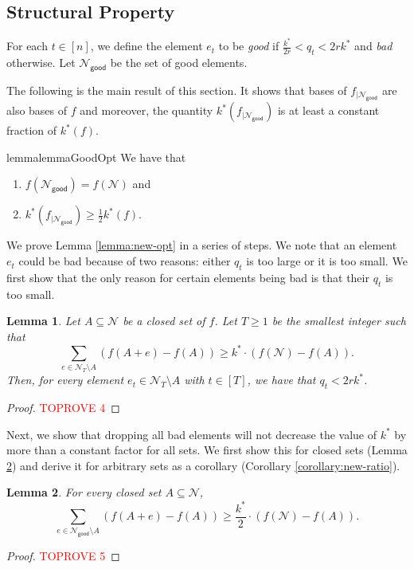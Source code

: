 \documentclass[11pt]{article}
\newtheorem{lemma}{Lemma}
\theoremstyle{definition}
\newcommand{\calN}{{\mathcal{N}}}
\newcommand{\good}{\mathsf{good}}
\begin{document}
\subsection{Structural Property}\label{subsection:structural-property}
For each $t \in [n]$, we define the element $e_t$ to be \emph{good} if $\frac{k^*}{2r}< q_t < 2rk^*$ and \emph{bad} otherwise. Let $\mathcal{N}_{\good}$ be the set of good elements. 
\iffalse
We define the following counterpart of $k^*$. 
\begin{equation}
    k^*_{\text{onl}}:=\min_{A\subseteq \mathcal{N}_{\good}: f(A)<f(\mathcal{N}_{\good})} \frac{\sum_{e\in \mathcal{N}_{\good}}f_A(e)}{f(\mathcal{N}_{\good})-f(A)}. \label{def:new-opt-k}
\end{equation}
\fi
The following is the main result of this section. It shows that bases of $f_{|\calN_{\good}}$ are also bases of $f$ and moreover, the quantity $k^*(f_{|\calN_{\good}})$ is at least a constant fraction of $k^*(f)$. 
\begin{restatable}{lemma}{lemmaGoodOpt}\label{lemma:new-opt}
We have that 
\begin{enumerate}
    \item $f(\calN_{\good})=f(\calN)$ and 
    \item $k^*(f_{|\calN_{\good}})\ge \frac{1}{2} k^*(f)$. 
\end{enumerate}
\end{restatable}
We prove Lemma \ref{lemma:new-opt} in a series of steps. 
We note that an element $e_t$ could be bad because of two reasons: either $q_t$ is too large or it is too small. 
We first show that the only reason for certain elements being bad is that their $q_t$ is too small. 


\begin{lemma}\label{lemma:q_t-upper-bound}
    Let $A\subseteq \mathcal{N}$ be a closed set of $f$. Let $T\geq 1$ be the smallest integer such that
    \begin{equation}\label{inequality-for-bad:k^*}
    \sum_{e\in \mathcal{N}_T\setminus A} \left(f(A+e)-f(A)\right) \geq k^*\cdot \left(f(\mathcal{N})-f(A)\right).
    \end{equation}
    Then, for every element $e_t\in \mathcal{N}_T\setminus A$ with $t\in [T]$, we have that $q_t<2rk^*$. 
\end{lemma}
\begin{proof}\textcolor{red}{TOPROVE 4}\end{proof}

Next, we show that dropping all bad elements will not decrease the value of $k^*$ by more than a constant factor for all sets. We first show this for closed sets (Lemma \ref{lemma:new-ratio-closed}) and derive it for arbitrary sets as a corollary (Corollary \ref{corollary:new-ratio}). 
\begin{lemma}\label{lemma:new-ratio-closed}
    For every closed set $A\subseteq \mathcal{N}$,
    $$\sum_{e\in \mathcal{N}_{\good}\setminus A} \left(f(A+e)-f(A)\right) \geq \frac{k^*}{2}\cdot \left(f(\mathcal{N})-f(A)\right).$$
\end{lemma}
\begin{proof}\textcolor{red}{TOPROVE 5}\end{proof}
\end{document}
